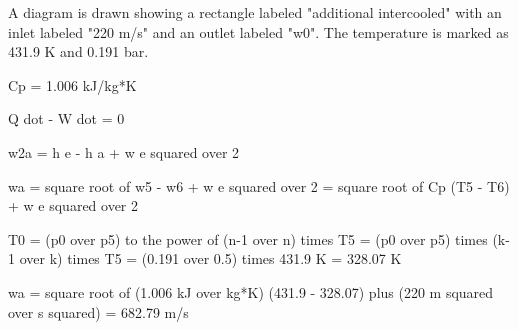 A diagram is drawn showing a rectangle labeled "additional intercooled" with an inlet labeled "220 m/s" and an outlet labeled "w0". The temperature is marked as 431.9 K and 0.191 bar.

Cp = 1.006 kJ/kg*K

Q dot - W dot = 0

w2a = h e - h a + w e squared over 2

wa = square root of w5 - w6 + w e squared over 2 = square root of Cp (T5 - T6) + w e squared over 2

T0 = (p0 over p5) to the power of (n-1 over n) times T5 = (p0 over p5) times (k-1 over k) times T5 = (0.191 over 0.5) times 431.9 K = 328.07 K

wa = square root of (1.006 kJ over kg*K) (431.9 - 328.07) plus (220 m squared over s squared) = 682.79 m/s